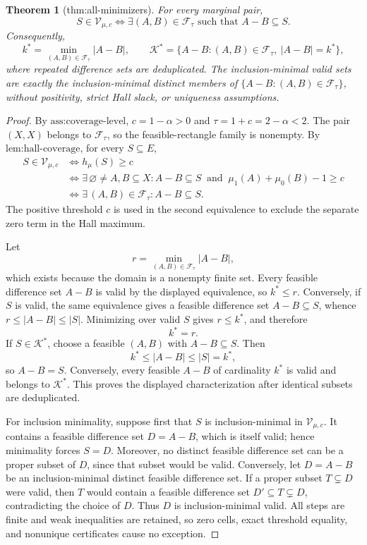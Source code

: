 \documentclass{article}
\newtheorem{theorem}{Theorem}
\begin{document}
\begin{theorem}[thm:all-minimizers]\label{thm:all-minimizers}
For every marginal pair, \[S\in\mathcal V_{\mu,c}\iff\exists(A,B)\in\mathcal F_{\tau}\text{ such that }A-B\subseteq S.\] Consequently, \[k^*=\min_{(A,B)\in\mathcal F_{\tau}}|A-B|,\qquad\mathcal K^*=\{A-B:(A,B)\in\mathcal F_{\tau},\ |A-B|=k^*\},\] where repeated difference sets are deduplicated. The inclusion-minimal valid sets are exactly the inclusion-minimal distinct members of \(\{A-B:(A,B)\in\mathcal F_{\tau}\}\), without positivity, strict Hall slack, or uniqueness assumptions.
\end{theorem}
\begin{proof}
By \(\text{ass:coverage-level}\), \(c=1-\alpha>0\) and \(\tau=1+c=2-\alpha<2\).  The pair \((X,X)\) belongs to \(\mathcal F_{\tau}\), so the feasible-rectangle family is nonempty.  By \(\text{lem:hall-coverage}\), for every \(S\subseteq E\),
\[
\begin{aligned}
S\in\mathcal V_{\mu,c}
&\iff h_{\mu}(S)\geq c\\
&\iff \exists\,\varnothing\neq A,B\subseteq X:
A-B\subseteq S\ \text{ and }\ \mu_1(A)+\mu_0(B)-1\geq c\\
&\iff \exists\,(A,B)\in\mathcal F_{\tau}:A-B\subseteq S.
\end{aligned}
\]
The positive threshold \(c\) is used in the second equivalence to exclude the separate zero term in the Hall maximum.

Let
\[
r=\min_{(A,B)\in\mathcal F_{\tau}}|A-B|,
\]
which exists because the domain is a nonempty finite set.  Every feasible difference set \(A-B\) is valid by the displayed equivalence, so \(k^*\leq r\).  Conversely, if \(S\) is valid, the same equivalence gives a feasible difference set \(A-B\subseteq S\), whence \(r\leq|A-B|\leq|S|\).  Minimizing over valid \(S\) gives \(r\leq k^*\), and therefore
\[
k^*=r.
\]
If \(S\in\mathcal K^*\), choose a feasible \((A,B)\) with \(A-B\subseteq S\).  Then
\[
k^*\leq|A-B|\leq|S|=k^*,
\]
so \(A-B=S\).  Conversely, every feasible \(A-B\) of cardinality \(k^*\) is valid and belongs to \(\mathcal K^*\).  This proves the displayed characterization after identical subsets are deduplicated.

For inclusion minimality, suppose first that \(S\) is inclusion-minimal in \(\mathcal V_{\mu,c}\).  It contains a feasible difference set \(D=A-B\), which is itself valid; hence minimality forces \(S=D\).  Moreover, no distinct feasible difference set can be a proper subset of \(D\), since that subset would be valid.  Conversely, let \(D=A-B\) be an inclusion-minimal distinct feasible difference set.  If a proper subset \(T\subsetneq D\) were valid, then \(T\) would contain a feasible difference set \(D'\subseteq T\subsetneq D\), contradicting the choice of \(D\).  Thus \(D\) is inclusion-minimal valid.  All steps are finite and weak inequalities are retained, so zero cells, exact threshold equality, and nonunique certificates cause no exception.
\end{proof}
\end{document}
